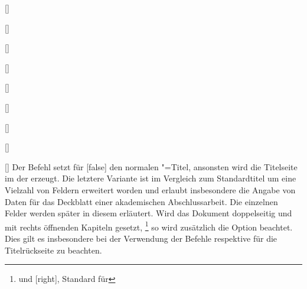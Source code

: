 \begin{Declaration}{}
\begin{Declaration}[v2.02]{%
  []%
}
\begin{Declaration}[v2.02]{[\PSet]}{%
}
\begin{Declaration}[v2.03]{[\PSet]}{%
}
\begin{Declaration}[v2.03]{[\PSet]}{%
}
\begin{Declaration}[v2.03]{%
  []%
}{}
\begin{Declaration}[v2.03]{%
  []
}{}
\begin{Declaration}[v2.03]{[\PSet]}{%
}
\begin{Declaration}[v2.03]{[\PSet]}{%
}
\begin{Declaration}[v2.03]{[\PSet]}{%
}
\printdeclarationlist%
%
%
%
Der Befehl  setzt für [false] den normalen 
\KOMAScript"=Titel{}, ansonsten wird die Titelseite im \CD der \TnUD erzeugt. 
Die letztere Variante ist im Vergleich zum Standardtitel um eine Vielzahl von 
Feldern erweitert worden und erlaubt insbesondere die Angabe von Daten für das 
Deckblatt einer akademischen Abschlussarbeit. Die einzelnen Felder werden 
später in diesem \autorefname erläutert. Wird das Dokument doppelseitig und mit 
rechts öffnenden Kapiteln gesetzt,%
\footnote{%
   und [right], Standard für 
}
so wird zusätzlich die Option  beachtet. Dies gilt es 
insbesondere bei der Verwendung der Befehle  respektive 
 für die Titelrückseite zu beachten.


\end{Declaration}
\end{Declaration}
\end{Declaration}
\end{Declaration}
\end{Declaration}
\end{Declaration}
\end{Declaration}
\end{Declaration}
\end{Declaration}
\end{Declaration}
